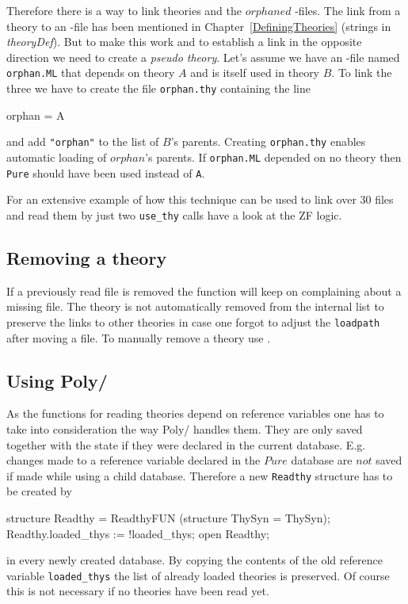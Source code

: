 Therefore there is a way to link theories and the $orphaned$ \ML-files. The
link from a theory to an \ML-file has been mentioned in
Chapter~\ref{DefiningTheories} (strings in {\it theoryDef}).  But to make this
work and to establish a link in the opposite direction we need to create a
{\it pseudo theory}.  Let's assume we have an \ML-file named {\tt orphan.ML}
that depends on theory $A$ and is itself used in theory $B$.  To link the
three we have to create the file {\tt orphan.thy} containing the line
\begin{ttbox}
orphan = A
\end{ttbox}
and add {\tt "orphan"} to the list of $B$'s parents.
Creating {\tt orphan.thy} enables automatic loading of $orphan$'s parents.
If {\tt orphan.ML} depended on no theory then {\tt Pure} should have been
used instead of {\tt A}.

For an extensive example of how this technique can be used to link over 30
files and read them by just two {\tt use_thy} calls have a look at the ZF
logic.


\subsection{Removing a theory}

If a previously read file is removed the  function will keep
on complaining about a missing file.  The theory is not automatically removed
from the internal list to preserve the links to other theories in case one
forgot to adjust the {\tt loadpath} after moving a file.  To manually remove a
theory use .


\subsection{Using Poly/\ML}

As the functions for reading theories depend on reference variables one has to
take into consideration the way Poly/\ML{} handles them.  They are only saved
together with the state if they were declared in the current database.  E.g.
changes made to a reference variable declared in the $Pure$ database are $not$
saved if made while using a child database.  Therefore a new {\tt Readthy}
structure has to be created by
\begin{ttbox}
structure Readthy = ReadthyFUN (structure ThySyn = ThySyn);
Readthy.loaded_thys := !loaded_thys;
open Readthy;
\end{ttbox}
in every newly created database.  By copying the contents of the old reference
variable \verb$loaded_thys$ the list of already loaded theories is preserved.
Of course this is not necessary if no theories have been read yet.


